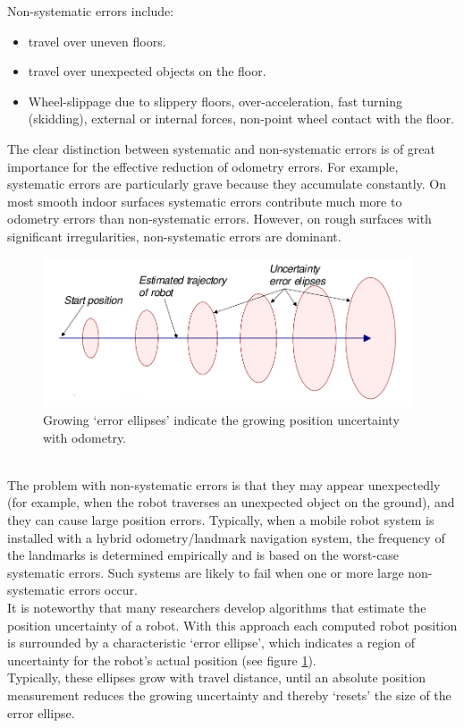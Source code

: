 Non-systematic errors include:

\begin{itemize}
\item travel over uneven floors.
\item travel over unexpected objects on the floor.
\item Wheel-slippage due to slippery floors, over-acceleration,
  fast turning (skidding), external or internal forces, non-point wheel
  contact with the floor.
\end{itemize}

The clear distinction between systematic and non-systematic errors is
of great importance for the effective reduction of odometry errors. For example,
systematic errors are particularly grave because they accumulate constantly.
On most smooth indoor surfaces systematic errors contribute much
more to odometry errors than non-systematic errors.
However, on rough surfaces with significant irregularities, non-systematic
errors are dominant.
\begin{figure} [h]
  \begin{center}
    \includegraphics[width=310pt]{img/odometry_error.png}
    \caption{Growing `error ellipses' indicate the growing position
      uncertainty with odometry.}
    \label{fig:odometry_error}
  \end{center}
\end{figure}
\\
The problem with non-systematic errors is that they may appear unexpectedly
(for example, when the robot traverses an unexpected object on the
ground), and they can cause large position errors. Typically, when a mobile
robot system is installed with a hybrid odometry/landmark navigation system,
the frequency of the landmarks is determined
empirically and is based on the worst-case systematic errors. Such systems
are likely to fail when one or more large non-systematic errors occur.
\\
It is noteworthy that many researchers develop algorithms that estimate
the position uncertainty of a robot. With this approach each computed robot
position is surrounded by a characteristic `error ellipse', which
indicates a region of uncertainty for the robot's actual position (see
figure \ref{fig:odometry_error}).
\\
Typically, these ellipses grow with travel distance, until an absolute
position measurement reduces the growing uncertainty and thereby `resets'
the size of the error ellipse.

